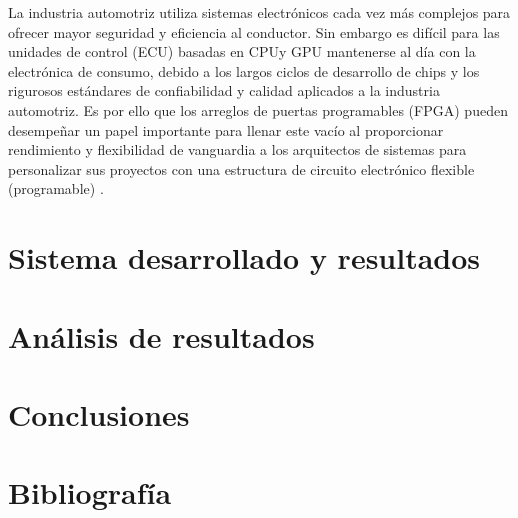 \documentclass[journal]{IEEEtran}
\begin{document}
	La industria automotriz utiliza sistemas electrónicos cada vez más complejos para ofrecer mayor seguridad y eficiencia al conductor. Sin embargo es difícil para las unidades de control (ECU) basadas en CPUy GPU mantenerse al día con la electrónica de consumo, debido a los largos ciclos de desarrollo de chips y los rigurosos estándares de confiabilidad y calidad aplicados a la industria automotriz. Es por ello que los arreglos de puertas programables (FPGA) pueden desempeñar un papel importante para llenar este vacío al proporcionar rendimiento y flexibilidad de vanguardia a los arquitectos de sistemas para personalizar sus proyectos con una estructura de circuito electrónico flexible (programable) \cite{Emilio2017}.
	
	
	\section{Sistema desarrollado y resultados}
	
	
	
	\section{Análisis de resultados}
	
	
	
	\section{Conclusiones}
	
	\section{Bibliografía}
	
	
	
	
\end{document}
